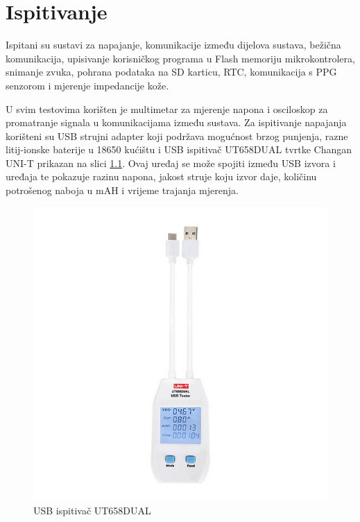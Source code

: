 \chapter{Ispitivanje}
Ispitani su sustavi za napajanje, komunikacije između dijelova sustava, bežična komunikacija, upisivanje korisničkog programa u Flash memoriju mikrokontrolera, snimanje zvuka, pohrana podataka na SD karticu, RTC, komunikacija s PPG senzorom i mjerenje impedancije kože.

U svim testovima korišten je multimetar za mjerenje napona i osciloskop za promatranje signala u komunikacijama između sustava. Za ispitivanje napajanja korišteni su USB strujni adapter koji podržava mogućnost brzog punjenja, razne litij-ionske baterije u 18650 kućištu i USB ispitivač UT658DUAL tvrtke Changan UNI-T prikazan na slici \ref{slk:UT658DUAL}. Ovaj uređaj se može spojiti između USB izvora i uređaja te pokazuje razinu napona, jakost struje koju izvor daje, količinu potrošenog naboja u mAH i vrijeme trajanja mjerenja.
\begin{figure}[htb]
    \centering
    \includegraphics[width=6 cm]{Figures/UT658DUAL.png}
    \caption{USB ispitivač UT658DUAL}
    \label{slk:UT658DUAL}
\end{figure}

